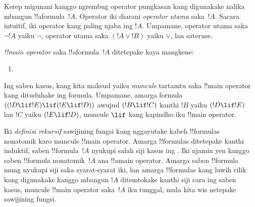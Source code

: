 \documentclass[../../../include/open-logic-section]{subfiles}
\begin{document}


\begin{explain}
Kerep migunani kanggo ngrembug operator pungkasan kang digunakake
nalika mbangun !!a{formula}~$!A$. Operator iki diarani \emph{operator
  utama} saka~$!A$. Sacara intuitif, iki operator kang paling njaba
ing $!A$. Umpamane, operator utama saka $\lnot !A$ yaiku $\lnot$,
operator utama saka $(!A \lor !B)$ yaiku $\lor$, lan sateruse.
\end{explain}


\begin{defn}
\emph{!!{main operator}} saka !!a{formula}~$!A$
ditetepake kaya mangkene:
\begin{enumerate}
\item {}







\end{enumerate}
\end{defn}

Ing saben kasus, kang kita maksud yaiku \emph{muncule} tartamtu
saka !!{main operator} kang dituduhake ing formula. Umpamane, amarga
formula $((!D \lif !E) \lif (!E \lif !D))$ awujud $(!B \lif !C)$
kanthi $!B$ yaiku $(!D \lif !E)$ lan $!C$ yaiku $(!E \lif !D)$,
muncule $\lif$ kang kapindho iku !!{main operator}.

\begin{explain}
Iki \emph{definisi rekursif} sawijining fungsi kang nggayutake kabeh
!!{formula}s nonatomik karo muncule !!{main operator}. Amarga
!!{formula}s ditetepake kanthi induktif, saben
!!{formula}~$!A$ nyukupi salah siji kasus ing .
Iki njamin yen kanggo saben !!{formula} nonatomik~$!A$ ana !!a{main
  operator}. Amarga saben !!{formula} mung nyukupi siji saka
syarat-syarat iki, lan amarga !!{formula}s kang luwih cilik kang
digunakake kanggo mbangun $!A$ ditemtokake kanthi siji cara ing
saben kasus, muncule !!{main
  operator} saka~$!A$ iku tunggal, mula kita wis netepake sawijining
fungsi.
\end{explain}
\end{document}
